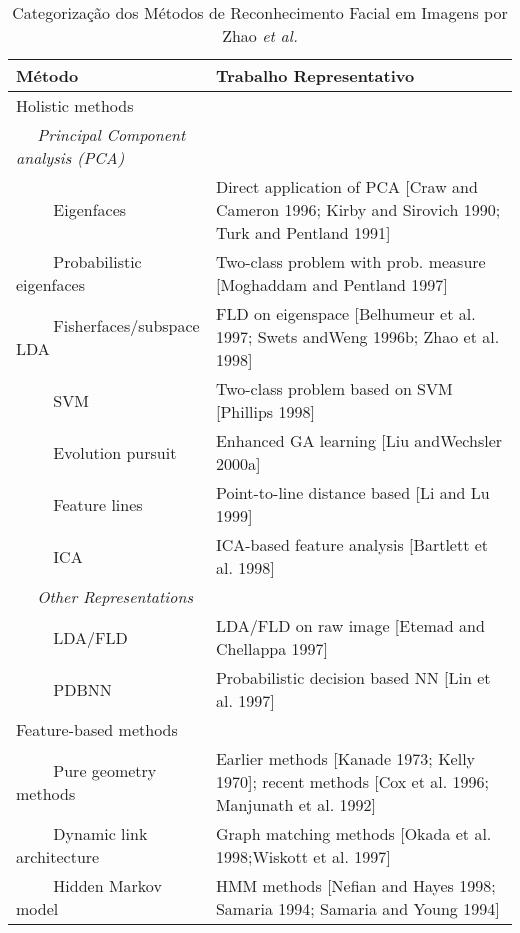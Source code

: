 \begin{center}
\begin{table}
	\caption{Categorização dos Métodos de Reconhecimento Facial em Imagens por Zhao \textit{et al.} \cite{Zhao2003}}
	\centering
	\begin{tabular}{l p{8cm}}
	\hline\hline
        Método                     & Trabalho Representativo\\
	\hline
Holistic methods	 \\	
$\quad$ \textit{Principal Component analysis (PCA)} \\
$\qquad$  Eigenfaces                 & Direct application of PCA [Craw and Cameron 1996; Kirby and Sirovich 1990; Turk and Pentland 1991] \\
$\qquad$        Probabilistic eigenfaces   & Two-class problem with prob. measure [Moghaddam and Pentland 1997] \\
$\qquad$        Fisherfaces/subspace LDA   & FLD on eigenspace [Belhumeur et al. 1997; Swets andWeng 1996b; Zhao et al. 1998] \\ 
$\qquad$        SVM                        & Two-class problem based on SVM [Phillips 1998] \\ 
$\qquad$        Evolution pursuit          & Enhanced GA learning [Liu andWechsler 2000a] \\ 
$\qquad$        Feature lines              & Point-to-line distance based [Li and Lu 1999] \\ 
$\qquad$        ICA                        & ICA-based feature analysis [Bartlett et al. 1998] \\ 
$\quad$ \textit{Other Representations} \\
$\qquad$        LDA/FLD                    & LDA/FLD on raw image [Etemad and Chellappa 1997] \\ 
$\qquad$        PDBNN                      & Probabilistic decision based NN [Lin et al. 1997] \\

Feature-based methods \\
$\qquad$        Pure geometry methods      & Earlier methods [Kanade 1973; Kelly 1970]; recent methods [Cox et al. 1996; Manjunath et al. 1992] \\ 
$\qquad$        Dynamic link architecture  & Graph matching methods [Okada et al. 1998;Wiskott et al. 1997] \\ 
$\qquad$        Hidden Markov model        & HMM methods [Nefian and Hayes 1998; Samaria 1994; Samaria and Young 1994] \\


\end{tabular}
\end{table}
\end{center}
